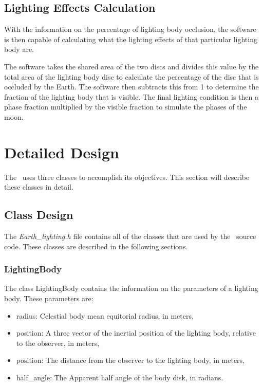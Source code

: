 \subsection{Lighting Effects Calculation}
With the information on the percentage of lighting body occlusion, the software
is then capable of calculating what the lighting effects of that particular
lighting body are.

The software takes the shared area of the two discs and divides this value by
the total area of the lighting body disc to calculate the percentage of the
disc that is occluded by the Earth.  The software then subtracts this from 1
to determine the fraction of the lighting body that is visible.  The final
lighting condition is then a phase fraction multiplied by the visible fraction
to simulate the phases of the moon.


\section{Detailed Design}

The \earthlightingDesc\ uses three classes to accomplish its objectives.
This section will describe these classes in detail.

\subsection{Class Design}

The {\em Earth\_lighting.h} file contains all of the classes
that are used by the \earthlightingDesc\ source code. These classes are
described in the following sections.

\subsubsection{LightingBody}
The class LightingBody contains the information on the
parameters of a lighting body. These parameters are:

\begin{itemize}
\item{radius:} Celestial body mean equitorial radius, in meters,
\item{position:} A three vector of the inertial position of the lighting
body, relative to the observer, in meters,
\item{position:} The distance from the observer to the lighting body, in meters,
\item{half\_angle:} The Apparent half angle of the body disk, in radians.
\end{itemize}

